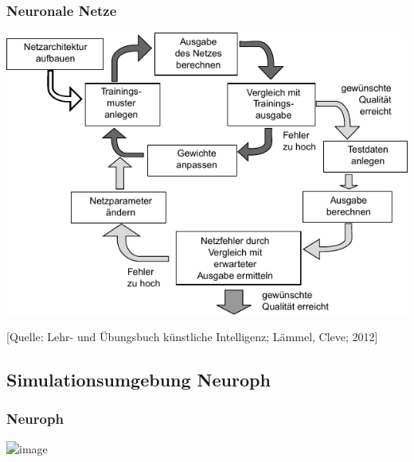 \documentclass[18pt]{beamer}
\begin{document}
	\begin{frame}[c]\frametitle{Neuronale Netze}
		\begin{center}
		\includegraphics[scale=.8]{images/workflow}
		\end{center}
		\begin{flushright}
		\tiny{[Quelle: Lehr- und Übungsbuch künstliche Intelligenz; Lämmel, Cleve; 2012]}
		\end{flushright}
	\end{frame}	
	
	\subsection{Simulationsumgebung Neuroph}
	\begin{frame}[c]\frametitle{Neuroph}
		\begin{center}
		\includegraphics<2>[width=.9\textwidth]{Grafiken/screenshot-big.jpg} 
		\end{center}
	\end{frame}		
	
\end{document}
